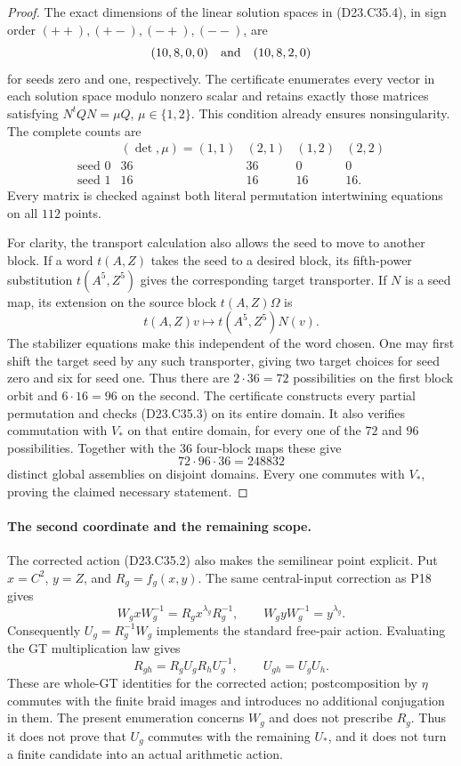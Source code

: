 \begin{proof}
The exact dimensions of the linear solution spaces in
(D23.C35.4), in sign order $(++),(+-),(-+),(--)$, are
\[
                 (10,8,0,0)\quad\hbox{and}\quad(10,8,2,0)
\]
for seeds zero and one, respectively. The certificate
enumerates every vector in each solution space modulo
nonzero scalar and retains exactly those matrices satisfying
$N^tQN=\mu Q$, $\mu\in\{1,2\}$. This condition already
ensures nonsingularity. The complete counts are
\[
\begin{array}{c|rrrr}
 & (\det,\mu)=(1,1)&(2,1)&(1,2)&(2,2)\\\hline
 \text{seed }0&36&36&0&0\\
 \text{seed }1&16&16&16&16.
\end{array}
\tag{D23.C35.5}
\]
Every matrix is checked against both literal permutation
intertwining equations on all $112$ points.

For clarity, the transport calculation also allows the seed
to move to another block. If a word $t(A,Z)$ takes the seed
to a desired block, its fifth-power substitution
$t(A^5,Z^5)$ gives the corresponding target transporter.
If $N$ is a seed map, its extension on the source block
$t(A,Z)\Omega$ is
\[
 t(A,Z)v\longmapsto t(A^5,Z^5)N(v).
\]
The stabilizer equations make this independent of the word
chosen. One may first shift the target seed by any such
transporter, giving two target choices for seed zero and
six for seed one. Thus there are $2\cdot36=72$ possibilities
on the first block orbit and $6\cdot16=96$ on the second.
The certificate constructs every partial permutation and
checks (D23.C35.3) on its entire domain. It also verifies
commutation with $V_*$ on that entire domain, for every
one of the $72$ and $96$ possibilities. Together with the
$36$ four-block maps these give
\[
                         72\cdot96\cdot36=248832
\]
distinct global assemblies on disjoint domains. Every one
commutes with $V_*$, proving the claimed necessary statement.
\end{proof}

\paragraph{The second coordinate and the remaining scope.}
The corrected action (D23.C35.2) also makes the semilinear
point explicit. Put $x=C^2$, $y=Z$, and
$R_g=f_g(x,y)$. The same central-input correction as P18 gives
\[
 W_gxW_g^{-1}=R_gx^{\lambda_g}R_g^{-1},\qquad
 W_gyW_g^{-1}=y^{\lambda_g}.
\]
Consequently $U_g=R_g^{-1}W_g$ implements the standard
free-pair action. Evaluating the GT multiplication law gives
\[
 R_{gh}=R_gU_gR_hU_g^{-1},\qquad U_{gh}=U_gU_h.
\tag{D23.C35.6}
\]
These are whole-GT identities for the corrected action;
postcomposition by $\eta$ commutes with the finite braid
images and introduces no additional conjugation in them.
The present enumeration concerns $W_g$ and does not prescribe
$R_g$. Thus it does not prove that $U_g$ commutes with the
remaining $U_*$, and it does not turn a finite candidate into
an actual arithmetic action.

